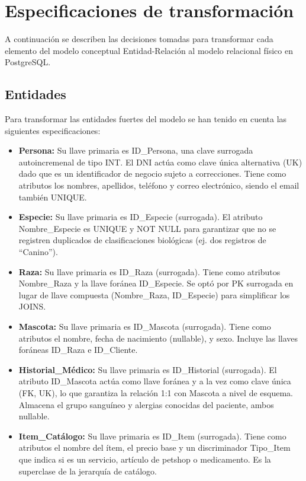 \section{Especificaciones de transformación}

A continuación se describen las decisiones tomadas para transformar cada elemento del modelo conceptual Entidad-Relación al modelo relacional físico en PostgreSQL.

\subsection{Entidades}

Para transformar las entidades fuertes del modelo se han tenido en cuenta las siguientes especificaciones:

\begin{itemize}
	\item \textbf{Persona:} Su llave primaria es ID\_Persona, una clave surrogada autoincremenal de tipo INT. El DNI actúa como clave única alternativa (UK) dado que es un identificador de negocio sujeto a correcciones. Tiene como atributos los nombres, apellidos, teléfono y correo electrónico, siendo el email también UNIQUE.
	\item \textbf{Especie:} Su llave primaria es ID\_Especie (surrogada). El atributo Nombre\_Especie es UNIQUE y NOT NULL para garantizar que no se registren duplicados de clasificaciones biológicas (ej. dos registros de ``Canino'').
	\item \textbf{Raza:} Su llave primaria es ID\_Raza (surrogada). Tiene como atributos Nombre\_Raza y la llave foránea ID\_Especie. Se optó por PK surrogada en lugar de llave compuesta (Nombre\_Raza, ID\_Especie) para simplificar los JOINS.
	\item \textbf{Mascota:} Su llave primaria es ID\_Mascota (surrogada). Tiene como atributos el nombre, fecha de nacimiento (nullable), y sexo. Incluye las llaves foráneas ID\_Raza e ID\_Cliente.
	\item \textbf{Historial\_Médico:} Su llave primaria es ID\_Historial (surrogada). El atributo ID\_Mascota actúa como llave foránea y a la vez como clave única (FK, UK), lo que garantiza la relación 1:1 con Mascota a nivel de esquema. Almacena el grupo sanguíneo y alergias conocidas del paciente, ambos nullable.
	\item \textbf{Item\_Catálogo:} Su llave primaria es ID\_Item (surrogada). Tiene como atributos el nombre del ítem, el precio base y un discriminador Tipo\_Item que indica si es un servicio, artículo de petshop o medicamento. Es la superclase de la jerarquía de catálogo.

\end{itemize}
